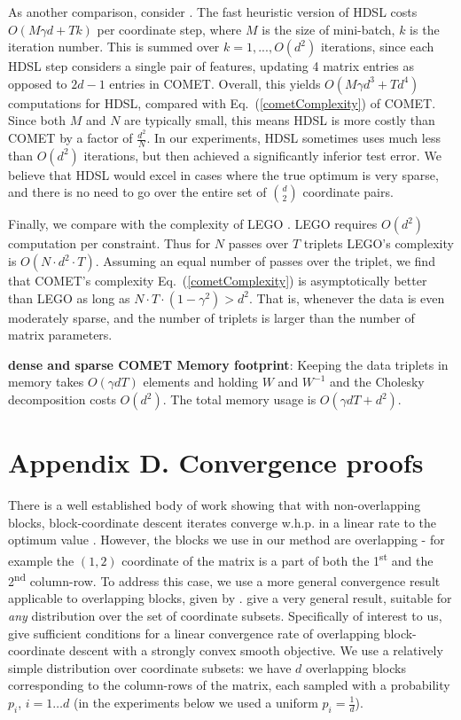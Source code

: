 \documentclass[twoside,11pt]{article}
\newcommand\mat[1]{{#1}}
\newcommand{\W}{\mat{W}}
\renewcommand{\eqref}[1]{Eq.~(\ref{#1})}
\begin{document}
As another comparison, consider \citet{HDSL}. The fast heuristic version of HDSL costs $O(M\gamma d+Tk)$ per coordinate step, where $M$ is the size of mini-batch, $k$ is the iteration number. This is summed over $k=1,...,O(d^2)$ iterations, since each HDSL step considers a single pair of features, updating 4 matrix entries as opposed to $2d-1$ entries in COMET. Overall, this yields $O(M\gamma d^3+Td^4)$ computations for HDSL, compared with \eqref{cometComplexity} of COMET. Since both $M$ and $N$ are typically small, this means HDSL is more costly than COMET by a factor of $\frac{d^2}{N}$. In our experiments, HDSL sometimes uses much less than $O(d^2)$ iterations, but then achieved a significantly inferior test error. We believe that HDSL would excel in cases where the true optimum is very sparse, and there is no need to go over the entire set of $d \choose 2$ coordinate pairs.

Finally, we compare with the complexity of LEGO \citep{lego}. LEGO requires $O(d^2)$ computation per constraint. Thus for $N$ passes over $T$ triplets LEGO's complexity is $O(N\cdot d^2 \cdot T)$. Assuming an equal number of passes over the triplet, we find that COMET's complexity \eqref{cometComplexity} is asymptotically better than LEGO as long as $N \cdot T \cdot (1-\gamma^2) > d^2$. That is, whenever the data is even moderately sparse, and the number of triplets is larger than the number of matrix parameters.

{\bf dense and sparse COMET Memory footprint}: Keeping the data triplets in memory takes $O(\gamma d T)$ elements and holding $\W$ and $\W^{-1}$ and the Cholesky decomposition costs $O(d^2)$. The total memory usage is $O(\gamma d T + d^2)$. 

\section*{Appendix D. Convergence proofs}

There is a well established body of work showing that with non-overlapping blocks, block-coordinate descent iterates converge w.h.p. in a linear rate to the optimum value \citep{nesterov2012efficiency,richtarik2014iteration}.
However, the blocks we use in our method are overlapping - for example the $(1,2)$ coordinate of the matrix is a part of both the 1\textsuperscript{st} and the 2\textsuperscript{nd} column-row. To address this case, we use a more general convergence result applicable to overlapping blocks, given by \citet{richtarik2013optimal}. \citeauthor{richtarik2013optimal} give a very general result, suitable for \emph{any} distribution over the set of coordinate subsets. 
Specifically of interest to us, \citeauthor{richtarik2013optimal} give sufficient conditions for a linear convergence rate of overlapping block-coordinate descent with a strongly convex smooth objective. 
We use a relatively simple distribution over coordinate subsets: we have $d$ overlapping blocks corresponding to the column-rows of the matrix, each sampled with a probability $p_i$, $i=1 \ldots d$ (in the experiments below we used a uniform $p_i = \frac{1}{d}$).
\end{document}
